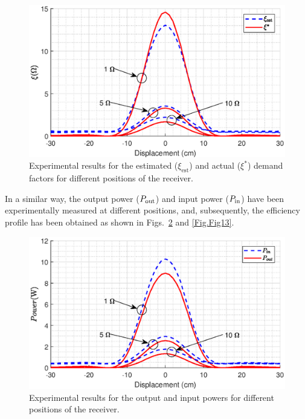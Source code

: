 \documentclass[journal,a4paper]{IEEEtran}
\begin{document}
\begin{figure}[t!]
\begin{center}
	\includegraphics[clip, trim=1cm 0.0cm 1cm 0.0cm, width=1\columnwidth]{Figs/Fig11.eps}
\end{center}
\vspace{-0.1cm}
	\caption{Experimental results for the estimated ($\xi_{\mathrm{est}}$) and actual ($\xi^*$) demand factors for different positions of the receiver.}
		\label{Fig.Fig11}
		\vspace{-3mm}
\end{figure}

In a similar way, the output power ($P_{\rm out}$) and input power ($P_{\rm in}$) have been experimentally measured at different positions, and, subsequently, the efficiency profile has been obtained as shown in Figs.~\ref{Fig.Fig12} and \ref{Fig.Fig13}.

\begin{figure}[t!]
\begin{center}
	\includegraphics[clip, trim=1cm 0.0cm 1cm 0.0cm, width=1\columnwidth]{Figs/Fig12.eps}
\end{center}
\vspace{-0.1cm}
	\caption{Experimental results for the output and input powers for different positions of the receiver.}
		\label{Fig.Fig12}
		\vspace{-3mm}
\end{figure}
\end{document}
